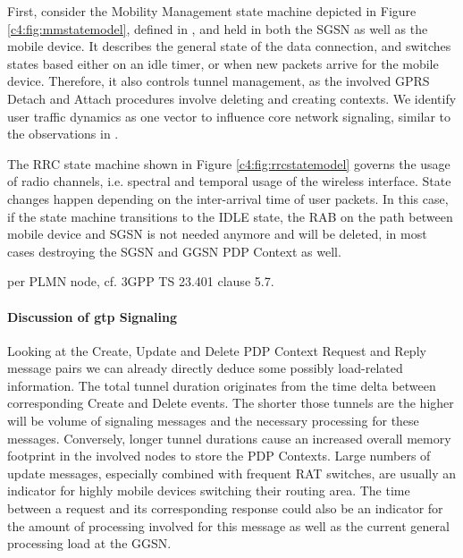 First, consider the Mobility Management state machine depicted in Figure \ref{c4:fig:mmstatemodel}, defined in \cite{3gpp.23.060}, and held in both the \gls{SGSN} as well as the mobile device. It describes the general state of the data connection, and switches states based either on an idle timer, or when new packets arrive for the mobile device. Therefore, it also controls tunnel management, as the involved \gls{GPRS} Detach and Attach procedures involve deleting and creating contexts. We identify user traffic dynamics as one vector to influence core network signaling, similar to the observations in \cite{lee2007detection}.


The \gls{RRC} state machine shown in Figure \ref{c4:fig:rrcstatemodel} governs the usage of radio channels, i.e. spectral and temporal usage of the wireless interface. State changes happen depending on the inter-arrival time of user packets. In this case, if the state machine transitions to the IDLE state, the \gls{RAB} on the path between mobile device and \gls{SGSN} is not needed anymore and will be deleted, in most cases destroying the \gls{SGSN} and \gls{GGSN} \gls{PDP} Context as well.

per \gls{PLMN} node, cf. \gls{3GPP} \gls{TS} 23.401 clause 5.7.






\paragraph{Discussion of \texorpdfstring{\acrshort{gtp}}{GTP} Signaling}

Looking at the Create, Update and Delete PDP Context Request and Reply message pairs we can already directly deduce some possibly load-related information. The total tunnel duration originates from the time delta between corresponding Create and Delete events. The shorter those tunnels are the higher will be volume of signaling messages and the necessary processing for these messages. Conversely, longer tunnel durations cause an increased overall memory footprint in the involved nodes to store the \gls{PDP} Contexts. Large numbers of update messages, especially combined with frequent \gls{RAT} switches, are usually an indicator for highly mobile devices switching their routing area. 
The time between a request and its corresponding response could also be an indicator for the amount of processing involved for this message as well as the current general processing load at the \gls{GGSN}.

